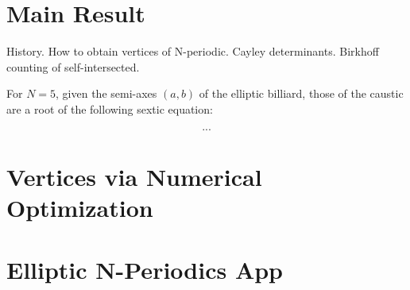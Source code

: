 \section{Main Result}

History. How to obtain vertices of N-periodic. Cayley determinants. Birkhoff counting of self-intersected.

\begin{theorem}
For $N=5$, given the semi-axes $(a,b)$ of the elliptic billiard, those of the caustic are a root of the following sextic equation:

\[ ... \]
\end{theorem}

\section{Vertices via Numerical Optimization}

\section{Elliptic N-Periodics App}



